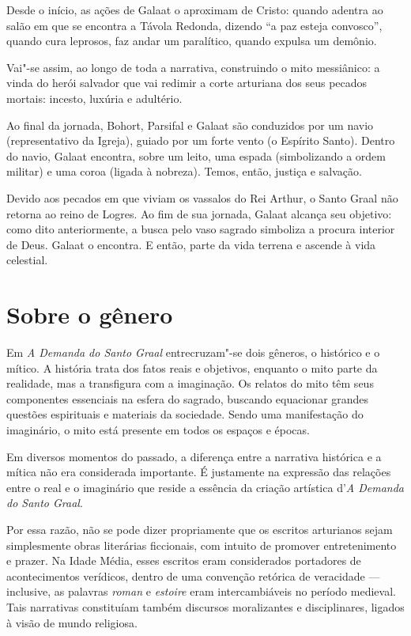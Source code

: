 Desde o início, as ações de Galaat o aproximam de Cristo:
quando adentra ao salão em que se encontra a Távola Redonda, dizendo ``a
paz esteja convosco'', quando cura leprosos, faz andar um paralítico,
quando expulsa um demônio.

Vai"-se assim, ao longo de toda a narrativa, construindo o mito
messiânico: a vinda do herói salvador que vai redimir a corte arturiana
dos seus pecados mortais: incesto, luxúria e
adultério.

Ao final da jornada, Bohort, Parsifal e Galaat são conduzidos
por um navio (representativo da Igreja), guiado por um forte vento (o
Espírito Santo). Dentro do navio, Galaat encontra, sobre um leito, uma
espada (simbolizando a ordem militar) e uma coroa (ligada à nobreza).
Temos, então, justiça e
salvação.

Devido aos pecados em que viviam os vassalos do Rei Arthur, o
Santo Graal não retorna ao reino de Logres. Ao fim de sua jornada,
Galaat alcança seu objetivo: como dito anteriormente, a busca pelo vaso
sagrado simboliza a procura interior de Deus. Galaat o encontra. E
então, parte da vida terrena e ascende à vida
celestial.

\section{Sobre o gênero}

Em \emph{A Demanda do Santo Graal} entrecruzam"-se dois gêneros, o histórico e o mítico. A história trata dos fatos reais e objetivos, enquanto o mito parte da
realidade, mas a transfigura com a imaginação. Os relatos do mito têm
seus componentes essenciais na esfera do sagrado, buscando equacionar
grandes questões espirituais e materiais da sociedade. Sendo uma
manifestação do imaginário, o mito está presente em todos os espaços e
épocas.

Em diversos momentos do passado, a diferença
entre a narrativa histórica e a mítica não era considerada importante. É
justamente na expressão das relações entre o real e o imaginário que
reside a essência da criação artística d'\emph{A Demanda do Santo
Graal}.

Por essa razão, não se pode dizer propriamente
que os escritos arturianos sejam simplesmente obras literárias
ficcionais, com intuito de promover entretenimento e prazer. Na Idade
Média, esses escritos eram considerados portadores de acontecimentos
verídicos, dentro de uma convenção retórica de veracidade --- inclusive, as
palavras \emph{roman} e \emph{estoire} eram intercambiáveis no período
medieval. Tais narrativas constituíam também discursos moralizantes e
disciplinares, ligados à visão de mundo religiosa.



